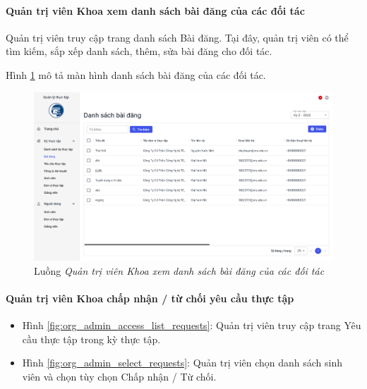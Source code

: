 \documentclass[./../main.tex]{subfiles}
\begin{document}
\paragraph*{Quản trị viên Khoa xem danh sách bài đăng của các đối tác}

Quản trị viên truy cập trang danh sách Bài đăng. Tại đây, quản trị viên có thể tìm kiếm, sắp xếp danh sách, thêm, sửa bài đăng cho đối tác.

Hình \ref{fig:orgadmin_list_posts} mô tả màn hình danh sách bài đăng của các đối tác.

\begin{figure}[]
	\includegraphics[width=\linewidth]{./images/image71.png}
	\caption{Luồng \emph{Quản trị viên Khoa xem danh sách bài đăng của các đối tác}}
	\label{fig:orgadmin_list_posts}
\end{figure}

\paragraph*{Quản trị viên Khoa chấp nhận / từ chối yêu cầu thực tập}

\begin{itemize}
	\item Hình \ref{fig:org_admin_access_list_requests}: Quản trị viên truy cập trang Yêu cầu thực tập trong kỳ thực tập. 
	\item Hình \ref{fig:org_admin_select_requests}: Quản trị viên chọn danh sách sinh viên và chọn tùy chọn Chấp nhận / Từ chối.
\end{itemize}
\end{document}
